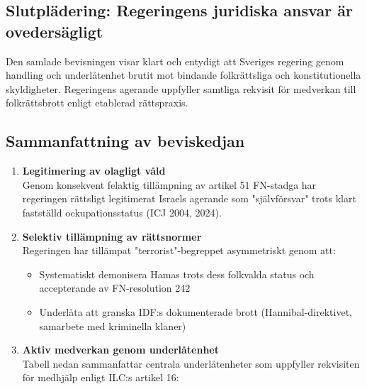 


\subsection{Slutplädering: Regeringens juridiska ansvar är ovedersägligt}


Den samlade bevisningen visar klart och entydigt att Sveriges regering genom handling och underlåtenhet brutit mot bindande folkrättsliga och konstitutionella skyldigheter. Regeringens agerande uppfyller samtliga rekvisit för medverkan till folkrättsbrott enligt etablerad rättspraxis.

\subsection*{Sammanfattning av beviskedjan}
\begin{enumerate}
    \item \textbf{Legitimering av olagligt våld} \\
    Genom konsekvent felaktig tillämpning av artikel 51 FN-stadga har regeringen rättsligt legitimerat Israels agerande som "självförsvar" trots klart fastställd ockupationsstatus (ICJ 2004, 2024).
    
    \item \textbf{Selektiv tillämpning av rättsnormer} \\
    Regeringen har tillämpat "terrorist"-begreppet asymmetriskt genom att:
    \begin{itemize}
        \item Systematiskt demonisera Hamas trots dess folkvalda status och accepterande av FN-resolution 242
        \item Underlåta att granska IDF:s dokumenterade brott (Hannibal-direktivet, samarbete med kriminella klaner)
    \end{itemize}
    
    \item \textbf{Aktiv medverkan genom underlåtenhet} \\
    Tabell nedan sammanfattar centrala underlåtenheter som uppfyller rekvisiten för medhjälp enligt ILC:s artikel 16:
\end{enumerate}


